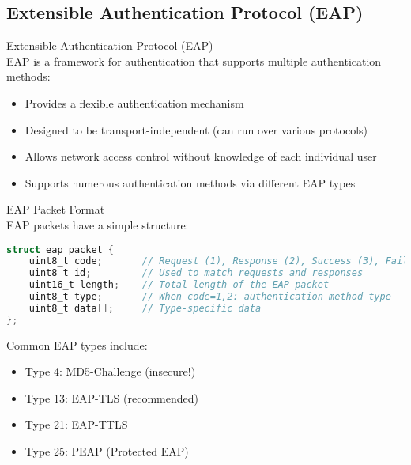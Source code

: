 \subsection{Extensible Authentication Protocol (EAP)}

\begin{definition}{Extensible Authentication Protocol (EAP)}\\
EAP is a framework for authentication that supports multiple authentication methods:
\begin{itemize}
    \item Provides a flexible authentication mechanism
    \item Designed to be transport-independent (can run over various protocols)
    \item Allows network access control without knowledge of each individual user
    \item Supports numerous authentication methods via different EAP types
\end{itemize}
\end{definition}

\begin{code}{EAP Packet Format}\\
EAP packets have a simple structure:
\begin{lstlisting}[language=C, style=basesmol]
struct eap_packet {
    uint8_t code;       // Request (1), Response (2), Success (3), Failure (4)
    uint8_t id;         // Used to match requests and responses
    uint16_t length;    // Total length of the EAP packet
    uint8_t type;       // When code=1,2: authentication method type
    uint8_t data[];     // Type-specific data
};
\end{lstlisting}

Common EAP types include:
\begin{itemize}
    \item Type 4: MD5-Challenge (insecure!)
    \item Type 13: EAP-TLS (recommended)
    \item Type 21: EAP-TTLS
    \item Type 25: PEAP (Protected EAP)
\end{itemize}
\end{code}

